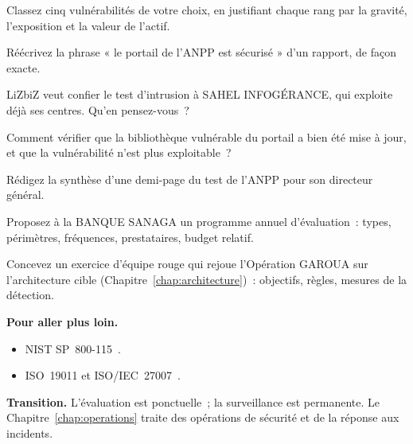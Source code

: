 \begin{boxexo}[title={\ding{45}\quad Exercice~21.4. Prioriser \niveaumoyen}]
Classez cinq vulnérabilités de votre choix, en justifiant chaque rang par
la gravité, l'exposition et la valeur de l'actif.
\end{boxexo}

\begin{boxexo}[title={\ding{45}\quad Exercice~21.5. La limite \niveaumoyen}]
Réécrivez la phrase « le portail de l'ANPP est sécurisé » d'un rapport,
de façon exacte.
\end{boxexo}

\begin{boxexo}[title={\ding{45}\quad Exercice~21.6. Le prestataire testeur \niveaumoyen}]
LiZbiZ veut confier le test d'intrusion à SAHEL INFOGÉRANCE, qui exploite
déjà ses centres. Qu'en pensez-vous~?
\end{boxexo}

\begin{boxexo}[title={\ding{45}\quad Exercice~21.7. Vérifier la correction \niveaumoyen}]
Comment vérifier que la bibliothèque vulnérable du portail a bien été
mise à jour, et que la vulnérabilité n'est plus exploitable~?
\end{boxexo}

\begin{boxexo}[title={\ding{45}\quad Exercice~21.8. Synthèse \niveaumoyen}]
Rédigez la synthèse d'une demi-page du test de l'ANPP pour son directeur
général.
\end{boxexo}

\begin{boxexo}[title={\ding{45}\quad Exercice~21.9. Un programme d'évaluation \niveauexpert}]
Proposez à la BANQUE SANAGA un programme annuel d'évaluation~: types,
périmètres, fréquences, prestataires, budget relatif.
\end{boxexo}

\begin{boxexo}[title={\ding{45}\quad Exercice~21.10. Rejouer GAROUA \niveauexpert}]
Concevez un exercice d'équipe rouge qui rejoue l'Opération GAROUA sur
l'architecture cible (Chapitre~\ref{chap:architecture})~: objectifs,
règles, mesures de la détection.
\end{boxexo}

\bigskip

\begin{boxinfo}
\textbf{Pour aller plus loin.}
\begin{itemize}
    \item NIST SP~800-115~\cite{nist2008sp800115}.
    \item ISO~19011 et ISO/IEC~27007~\cite{iso19011_2018,iso27007_2020}.
\end{itemize}
\end{boxinfo}

\begin{boxinfo}
\textbf{Transition.} L'évaluation est ponctuelle~; la surveillance est
permanente. Le Chapitre~\ref{chap:operations} traite des opérations de
sécurité et de la réponse aux incidents.
\end{boxinfo}
